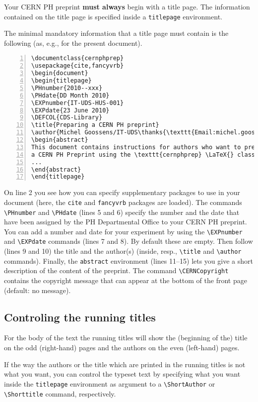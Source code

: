 \documentclass{cernphprep}
\providecommand*\eg{e.g.,\xspace}
\begin{document}
Your CERN PH preprint \textbf{must always} begin with a title page. The
information contained on the title page is specified inside a
\texttt{titlepage} environment.

The minimal mandatory information that a title page must contain is
the following (as, \eg for the present document).
\begin{Verbatim}[numbers=left,fontsize=\small]
\documentclass{cernphprep} 
\usepackage{cite,fancyvrb}
\begin{document}
\begin{titlepage}
\PHnumber{2010--xxx}
\PHdate{DD Month 2010}
\EXPnumber{IT-UDS-HUS-001}
\EXPdate{23 June 2010}
\DEFCOL{CDS-Library}
\title{Preparing a CERN PH preprint}
\author{Michel Goossens/IT-UDS\thanks{\texttt{Email:michel.goossens@cern.ch}}}
\begin{abstract}
This document contains instructions for authors who want to prepare
a CERN PH Preprint using the \texttt{cernphprep} \LaTeX{} class.
...
\end{abstract}
\end{titlepage}
\end{Verbatim}
On line 2 you see how you can specify supplementary packages to use in
your document (here, the \texttt{cite} and \texttt{fancyvrb} packages
are loaded). The commands \verb!\PHnumber! and \verb!\PHdate!  (lines
5 and 6) specify the number and the date that have been assigned by
the PH Departmental Office to your CERN PH preprint. You can add a
number and date for your experiment by using the \verb!\EXPnumber! and
\verb!\EXPdate! commands (lines 7 and 8). By default these are
empty. Then follow (lines 9 and 10) the title and the author(s)
(inside, resp., \verb!\title! and \verb!\author!  commands).  Finally,
the \texttt{abstract} environment (lines 11--15) lets you give a short
description of the content of the preprint. The command
\verb!\CERNCopyright! contains the copyright message that can appear
at the bottom of the front page (default: no message).

\subsection{Controling the running titles}

For the body of the text the running titles will show the (beginning
of the) title on the odd (right-hand) pages and the authors on the
even (left-hand) pages. 

If the way the authors or the title which are printed in the running
titles is not what you want, you can control the typeset text by
specifying what you want inside the \texttt{titlepage} environment as
argument to a \verb!\ShortAuthor! or \verb!\Shorttitle! command,
respectively.
\end{document}
